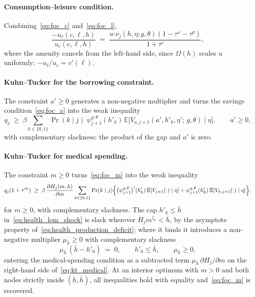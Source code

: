 \documentclass[12pt,a4paper]{article}
\newcommand{\E}{\mathbb{E}}
\begin{document}
\begin{appendices}
\paragraph{Consumption--leisure condition.} Combining~\eqref{eq:foc_c} and~\eqref{eq:foc_l},
\begin{equation}
\label{eq:cons_leisure}
\frac{-u_\ell(c, \ell, h)}{u_c(c, \ell, h)}
\;=\;
\frac{w\, \nu_j(h, \eta; g, \theta)(1-\tau^\omega-\tau^p)}{1 + \tau^c},
\end{equation}
where the amenity cancels from the left-hand side, since $\Omega(h)$ scales $u$ uniformly: $-u_\ell/u_c = v'(\ell)$.

\paragraph{Kuhn--Tucker for the borrowing constraint.}
The constraint $a' \geq 0$ generates a non-negative multiplier and turns the savings condition~\eqref{eq:foc_a} into the weak inequality
\begin{equation}
\label{eq:kt_borrowing}
q_j \;\geq\; \beta \sum_{k \in \{0,1\}} \Pr(k \mid j)\; \psi_{j+1}^{g,\theta}(h'_k)\, \E\bigl[V_{a, j+1}(a', h'_k, \eta';\, g, \theta) \mid \eta\bigr], \qquad a' \geq 0,
\end{equation}
with complementary slackness: the product of the gap and $a'$ is zero.

\paragraph{Kuhn--Tucker for medical spending.}
The constraint $m \geq 0$ turns~\eqref{eq:foc_m} into the weak inequality
\begin{equation}
\label{eq:kt_medical}
q_j (1 + \tau^m)
\;\geq\;
\beta\, \frac{\partial H_j(m,h)}{\partial m} \sum_{k \in \{0,1\}} \Pr(k \mid j)\Bigl\{
\bigl(\psi_{j+1}^{g,\theta}\bigr)'(h'_k)\, \E[V_{j+1}(\cdot) \mid \eta]
+ \psi_{j+1}^{g,\theta}(h'_k)\, \E[V_{h, j+1}(\cdot) \mid \eta]
\Bigr\},
\end{equation}
for $m \geq 0$, with complementary slackness. The cap $h'_k \leq \bar h$ in~\eqref{eq:health_lom_shock} is slack wherever $\overline{H}_j m^{\zeta_h} < \bar h$, by the asymptote property of~\eqref{eq:health_production_deficit}; where it binds it introduces a non-negative multiplier $\mu_{\bar h} \geq 0$ with complementary slackness
\begin{equation}
\label{eq:kt_healthcap}
\mu_{\bar h}\,(\bar h - h'_0) \;=\; 0, \qquad h'_0 \leq \bar h, \qquad \mu_{\bar h} \geq 0,
\end{equation}
entering the medical-spending condition as a subtracted term $\mu_{\bar h}\, \partial H_j/\partial m$ on the right-hand side of~\eqref{eq:kt_medical}. At an interior optimum with $m > 0$ and both nodes strictly inside $(\underline h, \bar h)$, all inequalities hold with equality and~\eqref{eq:foc_m} is recovered.


\end{appendices}
\end{document}
